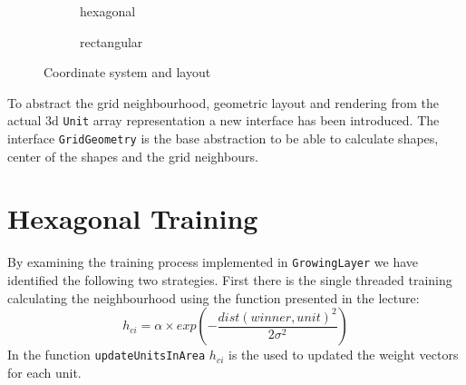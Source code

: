 \documentclass{acm_proc_article-sp}
\begin{document}
\begin{figure}
    \begin{subfigure}{1\linewidth}
    \centering
    \caption{hexagonal}
    \label{fig:coord-hex}
    \end{subfigure}

    \begin{subfigure}{1\linewidth}
        \centering
    \caption{rectangular}
    \label{fig:coord-rect}
    \end{subfigure}
    \caption{Coordinate system and layout}
    \label{fig:coord}
\end{figure}

To abstract the grid neighbourhood, geometric layout and rendering from the actual 3d \lstinline!Unit! array
representation a new interface has been introduced. The interface \lstinline!GridGeometry! is the base abstraction
to be able to calculate shapes, center of the shapes and the grid neighbours.

\section{Hexagonal Training}

By examining the training process implemented in \lstinline!GrowingLayer! we have identified the following two strategies.
First there is the single threaded training calculating the neighbourhood using the function presented in the lecture:
\[
    h_{ci} = \alpha \times exp(-\frac{dist(winner,unit)^2}{2\sigma^2})
\]
In the function \lstinline!updateUnitsInArea! $h_{ci}$ is the used to updated the weight vectors for each unit.
\end{document}
